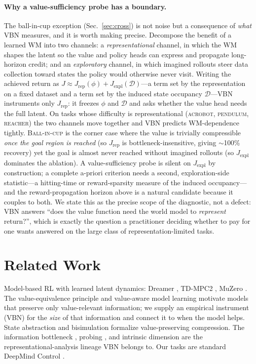 \documentclass[twocolumn,10pt]{article}
\begin{document}
\paragraph{Why a value-sufficiency probe has a boundary.}
The ball-in-cup exception (Sec.~\ref{sec:cross}) is not noise but a consequence
of \emph{what} VBN measures, and it is worth making precise. Decompose the
benefit of a learned WM into two channels: a \emph{representational} channel,
in which the WM shapes the latent so the value and policy heads can express and
propagate long-horizon credit; and an \emph{exploratory} channel, in which
imagined rollouts steer data collection toward states the policy would
otherwise never visit. Writing the achieved return as
$J \approx J_{\text{rep}}(\phi) + J_{\text{expl}}(\mathcal{D})$---a term set by
the representation on a fixed dataset and a term set by the induced state
occupancy $\mathcal{D}$---VBN instruments only $J_{\text{rep}}$: it freezes
$\phi$ and $\mathcal{D}$ and asks whether the value head needs the full latent.
On tasks whose difficulty is representational (\textsc{acrobot},
\textsc{pendulum}, \textsc{reacher}) the two channels move together and VBN
predicts WM-dependence tightly. \textsc{Ball-in-cup} is the corner case where
the value is trivially compressible \emph{once the goal region is reached}
(so $J_{\text{rep}}$ is bottleneck-insensitive, giving $\sim$100\% recovery)
yet the goal is almost never reached without imagined rollouts (so
$J_{\text{expl}}$ dominates the ablation). A value-sufficiency probe is silent
on $J_{\text{expl}}$ by construction; a complete a-priori criterion needs a
second, exploration-side statistic---a hitting-time or reward-sparsity measure
of the induced occupancy---and the reward-propagation horizon above is a
natural candidate because it couples to both. We state this as the precise
scope of the diagnostic, not a defect: VBN answers ``does the value function
need the world model to \emph{represent} return?'', which is exactly the
question a practitioner deciding whether to pay for one wants answered on the
large class of representation-limited tasks.

\section{Related Work}
Model-based RL with learned latent dynamics: Dreamer
\cite{hafner2023dreamerv3}, TD-MPC2 \cite{hansen2024tdmpc2}, MuZero
\cite{schrittwieser2020muzero}. The value-equivalence principle
\cite{grimm2020value} and value-aware model learning motivate models that
preserve only value-relevant information; we supply an empirical instrument
(VBN) for the \emph{size} of that information and connect it to when the model
helps. State abstraction \cite{li2006abstraction} and bisimulation
\cite{zhang2021dbc} formalize value-preserving compression. The information
bottleneck \cite{tishby1999ib,tishby2015dl}, probing \cite{alain2016probes},
and intrinsic dimension \cite{li2018intrinsic} are the representational-analysis
lineage VBN belongs to. Our tasks are standard DeepMind Control
\cite{tassa2018dmc}.
\end{document}
